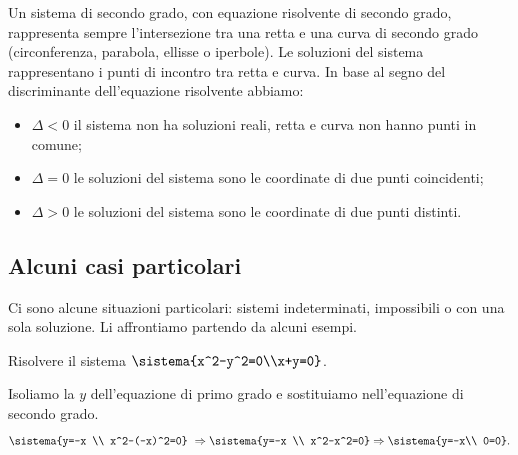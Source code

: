 \conclusione
Un sistema di secondo grado, con equazione risolvente di secondo grado, 
rappresenta sempre l'intersezione tra una retta e una curva di secondo 
grado (circonferenza, parabola, ellisse o iperbole). 
Le soluzioni del sistema rappresentano i punti di incontro tra retta e 
curva. 
In base al segno del discriminante dell'equazione risolvente abbiamo:
\begin{itemize}[nosep]
\item \(\Delta < 0\) il sistema non ha soluzioni reali, 
retta e curva non hanno punti in comune;
\item \(\Delta = 0\) le soluzioni del sistema sono le coordinate di due 
punti coincidenti;
\item \(\Delta > 0\) le soluzioni del sistema sono le coordinate di due 
punti distinti.
\end{itemize}
{\rettaconica}

\subsection{Alcuni casi particolari}
\label{subsec:sistemi2gr_casi_particolari}
  
Ci sono alcune situazioni particolari: sistemi indeterminati, 
impossibili o con una sola soluzione.
Li affrontiamo partendo da alcuni esempi.

\begin{esempio}{}{}
Risolvere il sistema 
\(\sistema{x^2-y^2=0\\x+y=0}\).

\medskip
Isoliamo la \(y\) dell'equazione di primo grado e sostituiamo 
nell'equazione di secondo grado. 
\[\sistema{y=-x \\
x^2-(-x)^2=0}\ 
\Rightarrow\sistema{y=-x \\
x^2-x^2=0} 
\Rightarrow\sistema{y=-x\\
0=0}.\]

\end{esempio}

